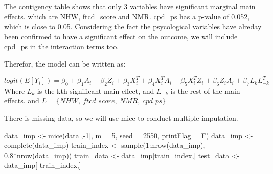 \documentclass[
  letterpaper,
  DIV=11,
  numbers=noendperiod]{scrartcl}
\newenvironment{Shaded}{\begin{snugshade}}{\end{snugshade}}
\newcommand{\AttributeTok}[1]{\textcolor[rgb]{0.40,0.45,0.13}{#1}}
\newcommand{\DecValTok}[1]{\textcolor[rgb]{0.68,0.00,0.00}{#1}}
\newcommand{\FloatTok}[1]{\textcolor[rgb]{0.68,0.00,0.00}{#1}}
\newcommand{\FunctionTok}[1]{\textcolor[rgb]{0.28,0.35,0.67}{#1}}
\newcommand{\NormalTok}[1]{\textcolor[rgb]{0.00,0.23,0.31}{#1}}
\newcommand{\OtherTok}[1]{\textcolor[rgb]{0.00,0.23,0.31}{#1}}
\newcommand{\SpecialCharTok}[1]{\textcolor[rgb]{0.37,0.37,0.37}{#1}}
\begin{document}
The contigency table shows that only 3 variables have significant
marginal main effects. which are NHW, ftcd\_score and NMR. cpd\_ps has a
p-value of 0.052, which is close to 0.05. Considering the fact the
psycological variables have alreday been confirmed to have a significant
effect on the outcome, we will include cpd\_ps in the interaction terms
too.

Therefor, the model can be written as:

\[
logit(E[Y_i]) = \beta_0  + \beta_1A_i + \beta_2Z_i + \beta_3X_i^T  + \beta_4X_i^TA_i + \beta_5X_i^TZ_i +\beta_6Z_iA_i + \beta_7L_kL_{-k}^T
\] Where \(L_k\) is the kth significant main effect, and \(L_{-k}\) is
the rest of the main effects. and
\(L = \{NHW, \ ftcd\_score,\  NMR,\ cpd\_ps\}\)

There is missing data, so we will use mice to conduct multiple
imputation.

\begin{Shaded}
\begin{Highlighting}[]
\NormalTok{data\_imp }\OtherTok{\textless{}{-}} \FunctionTok{mice}\NormalTok{(data[,}\SpecialCharTok{{-}}\DecValTok{1}\NormalTok{], }\AttributeTok{m =} \DecValTok{5}\NormalTok{, }\AttributeTok{seed =} \DecValTok{2550}\NormalTok{, }\AttributeTok{printFlag =}\NormalTok{ F)}
\NormalTok{data\_imp }\OtherTok{\textless{}{-}} \FunctionTok{complete}\NormalTok{(data\_imp)}
\NormalTok{train\_index }\OtherTok{\textless{}{-}} \FunctionTok{sample}\NormalTok{(}\DecValTok{1}\SpecialCharTok{:}\FunctionTok{nrow}\NormalTok{(data\_imp), }\FloatTok{0.8}\SpecialCharTok{*}\FunctionTok{nrow}\NormalTok{(data\_imp))}
\NormalTok{train\_data }\OtherTok{\textless{}{-}}\NormalTok{ data\_imp[train\_index,]}
\NormalTok{test\_data }\OtherTok{\textless{}{-}}\NormalTok{ data\_imp[}\SpecialCharTok{{-}}\NormalTok{train\_index,]}
\end{Highlighting}
\end{Shaded}
\end{document}
